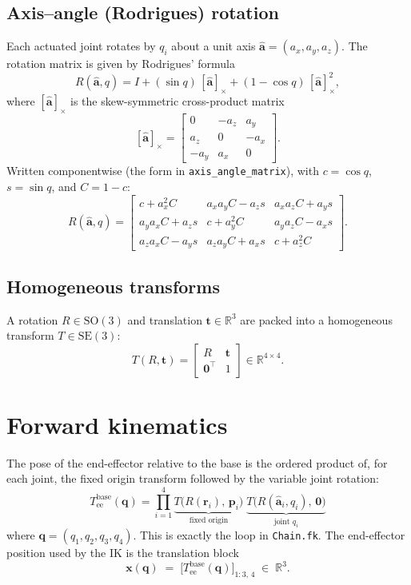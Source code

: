 \documentclass[11pt]{article}
\newcommand{\R}{\mathbb{R}}
\newcommand{\SOO}{\mathrm{SO}(3)}
\newcommand{\SEE}{\mathrm{SE}(3)}
\newcommand{\skewm}[1]{\left[#1\right]_{\times}}
\begin{document}
\subsection{Axis--angle (Rodrigues) rotation}

Each actuated joint rotates by $q_i$ about a unit axis
$\hat{\bm{a}}=(a_x,a_y,a_z)$. The rotation matrix is given by Rodrigues'
formula
\begin{equation}
R(\hat{\bm{a}},q)=I + (\sin q)\,\skewm{\hat{\bm{a}}}
        + (1-\cos q)\,\skewm{\hat{\bm{a}}}^2,
\end{equation}
where $\skewm{\hat{\bm{a}}}$ is the skew-symmetric cross-product matrix
\[
\skewm{\hat{\bm{a}}}=
\begin{bmatrix}0&-a_z&a_y\\ a_z&0&-a_x\\ -a_y&a_x&0\end{bmatrix}.
\]
Written componentwise (the form in \texttt{axis\_angle\_matrix}), with
$c=\cos q$, $s=\sin q$, and $C=1-c$:
\begin{equation}
R(\hat{\bm{a}},q)=
\begin{bmatrix}
c+a_x^2 C        & a_x a_y C - a_z s & a_x a_z C + a_y s \\
a_y a_x C + a_z s & c+a_y^2 C        & a_y a_z C - a_x s \\
a_z a_x C - a_y s & a_z a_y C + a_x s & c+a_z^2 C
\end{bmatrix}.
\end{equation}

\subsection{Homogeneous transforms}

A rotation $R\in\SOO$ and translation $\bm{t}\in\R^3$ are packed into a
homogeneous transform $T\in\SEE$:
\begin{equation}
T(R,\bm{t})=\begin{bmatrix}R & \bm{t}\\ \bm{0}^\top & 1\end{bmatrix}\in\R^{4\times4}.
\end{equation}

\section{Forward kinematics}

The pose of the end-effector relative to the base is the ordered product of,
for each joint, the fixed origin transform followed by the variable joint
rotation:
\begin{equation}
\boxed{\;
T^{\text{base}}_{\text{ee}}(\bm{q})
  = \prod_{i=1}^{4}
      \underbrace{T\!\big(R(\bm{r}_i),\,\bm{p}_i\big)}_{\text{fixed origin}}
      \;\underbrace{T\!\big(R(\hat{\bm{a}}_i, q_i),\,\bm{0}\big)}_{\text{joint }q_i}
\;}
\end{equation}
where $\bm{q}=(q_1,q_2,q_3,q_4)$. This is exactly the loop in
\texttt{Chain.fk}. The end-effector position used by the IK is the
translation block
\begin{equation}
\bm{x}(\bm{q}) \;=\; \big[T^{\text{base}}_{\text{ee}}(\bm{q})\big]_{1:3,\,4}\;\in\;\R^3 .
\end{equation}
\end{document}
